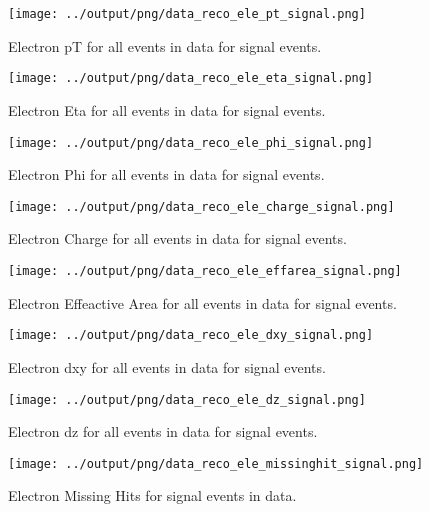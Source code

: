 \documentclass[11pt]{book}
\begin{document}
\begin{figure}[htb]
\centering
\texttt{[image: ../output/png/data\_reco\_ele\_pt\_signal.png]}
\caption{Electron pT for all events in data for signal events.}
\label{fig:data_ele_pt_signal}
\end{figure}

\begin{figure}[htb]
\centering
\texttt{[image: ../output/png/data\_reco\_ele\_eta\_signal.png]}
\caption{Electron Eta for all events in data for signal events.}
\label{fig:data_ele_eta_signal}
\end{figure}

\begin{figure}[htb]
\centering
\texttt{[image: ../output/png/data\_reco\_ele\_phi\_signal.png]}
\caption{Electron Phi for all events in data for signal events.}
\label{fig:data_ele_phi_signal}
\end{figure}

\begin{figure}[htb]
\centering
\texttt{[image: ../output/png/data\_reco\_ele\_charge\_signal.png]}
\caption{Electron Charge for all events in data for signal events.}
\label{fig:data_ele_charge_signal}
\end{figure}

\begin{figure}[htb]
\centering
\texttt{[image: ../output/png/data\_reco\_ele\_effarea\_signal.png]}
\caption{Electron Effeactive Area for all events in data for signal events.}
\label{fig:data_ele_effarea_signal}
\end{figure}

\begin{figure}[htb]
\centering
\texttt{[image: ../output/png/data\_reco\_ele\_dxy\_signal.png]}
\caption{Electron dxy for all events in data for signal events.}
\label{fig:data_ele_dxy_signal}
\end{figure}

\begin{figure}[htb]
\centering
\texttt{[image: ../output/png/data\_reco\_ele\_dz\_signal.png]}
\caption{Electron dz for all events in data for signal events.}
\label{fig:data_ele_dz_signal}
\end{figure}

\begin{figure}[htb]
\centering
\texttt{[image: ../output/png/data\_reco\_ele\_missinghit\_signal.png]}
\caption{Electron Missing Hits for signal events in data.}
\label{fig:data_ele_missinghit_signal}
\end{figure}
\clearpage
\end{document}
